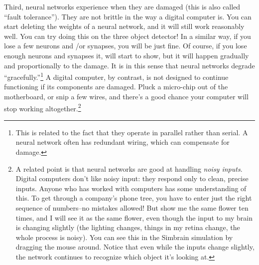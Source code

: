 Third, neural networks experience  when they are damaged (this is also called ``fault tolerance''). They are not brittle in the way a digital computer is. You can start deleting the weights of a neural network, and it will still work reasonably well. You can try doing this on the three object detector! In a  similar way, if you lose a few neurons and /or synapses, you will be just fine. Of course, if you lose enough neurons and synapses it, will start to show, but it will happen gradually and  proportionally to the damage. It is in this sense that neural networks degrade ``gracefully.''\footnote{This is related to the fact that they operate in parallel rather than serial. A neural network often has redundant wiring, which can compensate for damage.}  A digital computer, by contrast, is not designed to continue functioning if its components are damaged. Pluck a micro-chip out of the motherboard, or snip a few wires, and there's a good chance your computer will stop working altogether.\footnote{A related point is that neural networks are good at handling \emph{noisy inputs}. Digital computers don't like noisy input: they respond only to clean, precise inputs. Anyone who has worked with computers has some understanding of this. To get through a company's phone tree, you have to enter just the right sequence of numbers--no mistakes allowed!  But show me the same flower ten times, and I will see it as the same flower, even though the input to my brain is changing slightly (the lighting changes, things in my retina change, the whole process is noisy). You can see this in the Simbrain simulation by dragging the mouse around. Notice that even while the inputs change slightly, the network continues to recognize which object it's looking at.}

